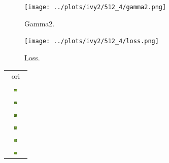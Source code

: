 \documentclass[letter]{article}
\begin{document}
\begin{figure}[h!]
	\centering
	\texttt{[image: ../plots/ivy2/512\_4/gamma2.png]}
	\caption{\label{fig:gamma1}Gamma2.}
\end{figure}

\begin{figure}[h!]
	\centering
	\texttt{[image: ../plots/ivy2/512\_4/loss.png]}
	\caption{\label{fig:gamma1}Loss.}
\end{figure}

\newpage

\begin{table}[h!]
	\centering
	\begin{tabular}{c}
		ori\tabularnewline
		\includegraphics[width=0.17\textwidth]{../data/ivy2/512/1} \tabularnewline		\includegraphics[width=0.17\textwidth]{../data/ivy2/512/2} \tabularnewline		\includegraphics[width=0.17\textwidth]{../data/ivy2/512/3} \tabularnewline		\includegraphics[width=0.17\textwidth]{../data/ivy2/512/4} \tabularnewline		\includegraphics[width=0.17\textwidth]{../data/ivy2/512/5} \tabularnewline		\includegraphics[width=0.17\textwidth]{../data/ivy2/512/6} \tabularnewline

\end{tabular}
\end{table}
\end{document}
